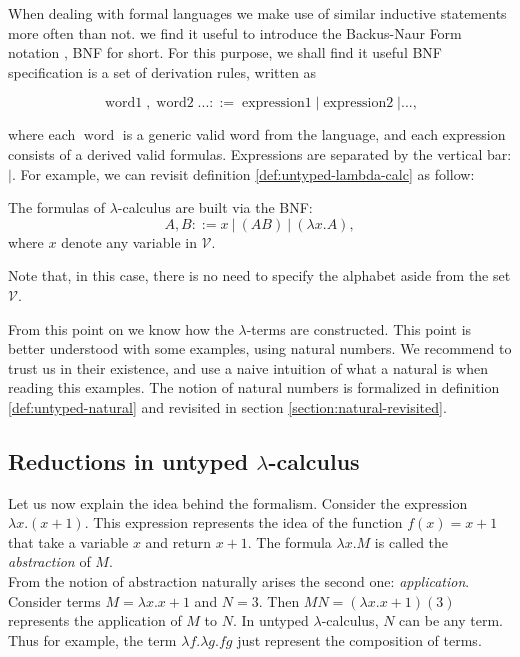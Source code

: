 When dealing with formal languages we make use of similar inductive statements more often than not. we find it useful to introduce the Backus-Naur Form notation \cite{knuth1964backus}, BNF for short.  For this purpose, we shall find it useful BNF specification is a set of derivation rules, written as

$$\operatorname{word1}, \operatorname{word2} ... ::= \operatorname{expression1} | \operatorname{expression2} |...,$$

where each $\operatorname{word}$ is a generic valid word from the language, and each  expression consists of a derived valid formulas. Expressions are separated by the vertical bar: $|$. For example, we can revisit definition \ref{def:untyped-lambda-calc} as follow:

\begin{definition}
  The formulas of  $\lambda$-calculus are built via the BNF:
  $$A,B ::= x\ |\ (AB)\ |\ (\lambda x.A) ,$$
  where $x$ denote any variable in $\mathcal{V}$.
\end{definition}
\begin{remark}
  Note that, in this case, there is no need to specify the alphabet aside from the set $\mathcal{V}$.
\end{remark}

From this point on we know how the $\lambda$-terms are constructed. This point is better understood with some examples, using natural numbers.  We recommend to trust us in their existence, and use a naive intuition of what a natural is when  reading this examples. The notion of natural numbers is formalized in definition \ref{def:untyped-natural} and revisited in section \ref{section:natural-revisited}.\\

\subsection{Reductions in untyped $\lambda$-calculus}
Let us now explain the idea behind the formalism. Consider the expression $\lambda x.(x+1)$. This expression represents the idea of the function $f(x)=x+1$ that take a variable $x$ and return $x+1$. The formula $\lambda x.M$ is called the \emph{abstraction} of $M$.\\

From the notion of abstraction naturally arises the second one: \emph{application}. Consider terms $M  =\lambda x. x+1$ and $N = 3$. Then $MN = (\lambda x. x+1)(3)$ represents the application of $M$ to $N$. In untyped $\lambda$-calculus, $N$ can be any term. Thus for example, the term $\lambda f.\lambda g. fg$ just represent the composition of terms.   


